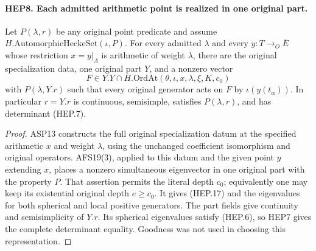 \documentclass[11pt,a4paper]{article}
\numberwithin{equation}{section}
\theoremstyle{remark}\newtheorem{remark}[theorem]{Remark}
\begin{document}
\paragraph{HEP8. Each admitted arithmetic point is realized in one original part.}
\label{claim:HEP8}
Let $P(\lambda,r)$ be any original point predicate and assume
$H.\mathrm{AutomorphicHeckeSet}(\iota,P)$.
For every admitted $\lambda$ and every $y:T\to_O\overline E$
whose restriction $x=y|_A$ is arithmetic of weight $\lambda$,
there are the original specialization data, one original part $Y$,
and a nonzero vector
\[
 F\in Y.Y\cap H.\mathrm{OrdAt}
                   (\theta,\iota,x,\lambda,\xi,K,c_0)
 \tag{HEP.17}
\]
with $P(\lambda,Y.r)$ such that every original generator acts on
$F$ by $\iota(y(t_\alpha))$.  In particular $r=Y.r$ is continuous,
semisimple, satisfies $P(\lambda,r)$, and has determinant (HEP.7).
\begin{proof}
ASP13 constructs the full original specialization datum at the
specified arithmetic $x$ and weight $\lambda$, using the unchanged
coefficient isomorphism and original operators.  AFS19(3), applied
to this datum and the given point $y$ extending $x$, places a
nonzero simultaneous eigenvector in one original part with the
property $P$.  That assertion permits the literal depth $c_0$;
equivalently one may keep its existential original depth $e\geq c_0$.
It gives (HEP.17) and the eigenvalues for both spherical and local
positive generators.  The part fields give continuity and
semisimplicity of $Y.r$.  Its spherical eigenvalues satisfy (HEP.6),
so HEP7 gives the complete determinant equality.  Goodness was
not used in choosing this representation.
\end{proof}

\end{document}
